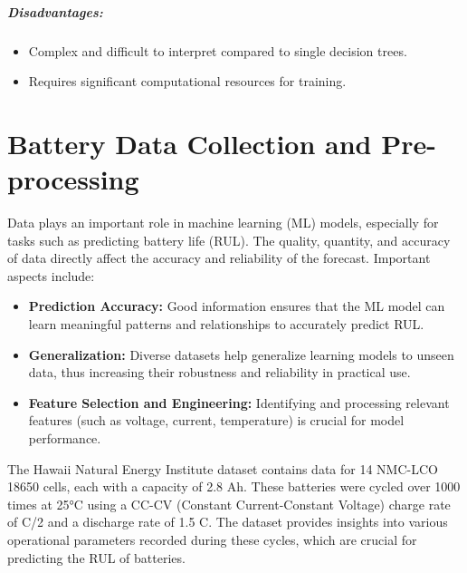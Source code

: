 \paragraph{Disadvantages:}
\begin{itemize}
    \item Complex and difficult to interpret compared to single decision trees.
    \item Requires significant computational resources for training.
\end{itemize}


\chapter{Battery Data Collection and Pre-processing}

\begin{justifying}
Data plays an important role in machine learning (ML) models, especially for tasks such as predicting battery life (RUL). The quality, quantity, and accuracy of data directly affect the accuracy and reliability of the forecast. Important aspects include:

\begin{itemize}
    \item \textbf{Prediction Accuracy:} Good information ensures that the ML model can learn meaningful patterns and relationships to accurately predict RUL.
    \item \textbf{Generalization:} Diverse datasets help generalize learning models to unseen data, thus increasing their robustness and reliability in practical use.
    \item \textbf{Feature Selection and Engineering:} Identifying and processing relevant features (such as voltage, current, temperature) is crucial for model performance.
\end{itemize}

The Hawaii Natural Energy Institute dataset contains data for 14 NMC-LCO 18650 cells, each with a capacity of 2.8 Ah. These batteries were cycled over 1000 times at 25°C using a CC-CV (Constant Current-Constant Voltage) charge rate of C/2 and a discharge rate of 1.5 C. The dataset provides insights into various operational parameters recorded during these cycles, which are crucial for predicting the RUL of batteries.
\end{justifying}

